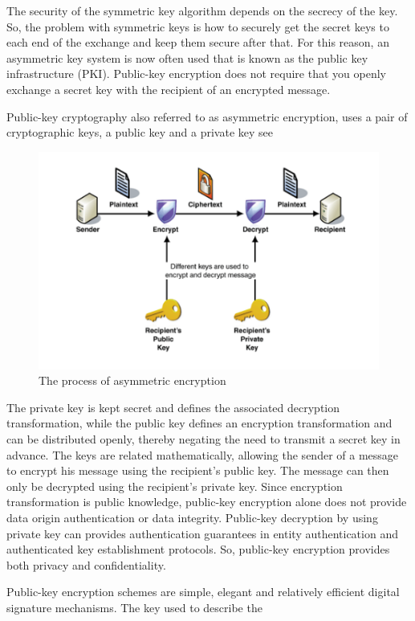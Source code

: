 \documentclass[12pt,journal,compsoc]{IEEEtran}
\begin{document}
The security of the symmetric key algorithm depends on the secrecy of
the key. So, the problem with symmetric keys is how to securely get
the secret keys to each end of the exchange and keep them secure after
that. For this reason, an asymmetric key system is now often used that
is known as the public key infrastructure (PKI). Public-key encryption
does not require that you openly exchange a secret key with the
recipient of an encrypted message. 
\par
Public-key cryptography also referred to as asymmetric encryption,
uses a pair of cryptographic keys, a public key and a private key see 
\begin{figure}[!t]
  \centering
  \includegraphics[scale=0.5]{Figure/Asymmetric.png}
  \caption{The process of asymmetric encryption}
  \label{fig:intro-process-of-asymetric}
\end{figure} 
The private key is kept secret and defines the associated
decryption transformation, while the public key defines an encryption
transformation and can be distributed openly, thereby negating the
need to transmit a secret key in advance. The keys are related
mathematically, allowing the sender of a message to encrypt his
message using the recipient's public key. The message can then only be
decrypted using the recipient's private key. Since encryption
transformation is public knowledge, public-key encryption alone does
not provide data origin authentication or data integrity. Public-key
decryption by using private key can provides authentication guarantees
in entity authentication and authenticated key establishment
protocols. So, public-key encryption provides both privacy and
confidentiality. 
\par
Public-key encryption schemes are simple, elegant and relatively
efficient digital signature mechanisms. The key used to describe the
\end{document}
